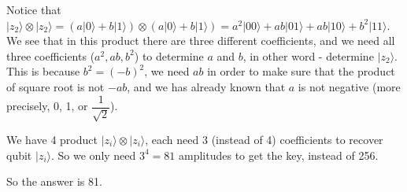 \documentclass{article}
\begin{document}
Notice that $\lvert z_2 \rangle \otimes \lvert z_2 \rangle = (a \lvert 0 \rangle + b \lvert 1 \rangle) \otimes (a \lvert 0 \rangle + b \lvert 1 \rangle) = a^2 \lvert 00 \rangle + ab \lvert 01 \rangle + ab \lvert 10 \rangle + b^2 \lvert 11 \rangle$. We see that in this product there are three different coefficients, and we need all three coefficients ($a^2, ab, b^2$) to determine $a$ and $b$, in other word - determine $\lvert z_2 \rangle$. This is because $b^2 = (-b)^2$, we need $ab$ in order to make sure that the product of square root is not $-ab$, and we has already known that $a$ is not negative (more precisely, 0, 1, or $\dfrac{1}{\sqrt{2}}$).

We have 4 product $\lvert z_i \rangle \otimes \lvert z_i \rangle$, each need 3 (instead of 4) coefficients to recover qubit $\lvert z_i \rangle$. So we only need $3^4 = 81$ amplitudes to get the key, instead of 256.

So the answer is 81.
\end{document}
